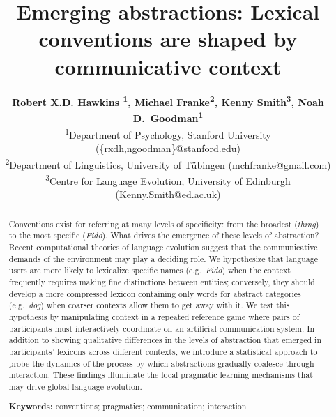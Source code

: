 \documentclass[10pt,letterpaper]{article}
\title{Emerging abstractions: Lexical conventions are shaped by communicative context}
\author{{\large \bf Robert X.D. Hawkins \textsuperscript{1}, Michael Franke\textsuperscript{2}, Kenny Smith\textsuperscript{3}, Noah D.~Goodman\textsuperscript{1}} \\
   \textsuperscript{1}Department of Psychology, Stanford University (\{rxdh,ngoodman\}@stanford.edu) \\
  \textsuperscript{2}Department of Linguistics, University of T\"ubingen (mchfranke@gmail.com)\\
  \textsuperscript{3}Centre for Language Evolution, University of Edinburgh (Kenny.Smith@ed.ac.uk)}
\newcommand{\mf}[1]{\textcolor{Red}{[ndg: #1]}}
\begin{document}
\maketitle



\begin{abstract}
Conventions exist for referring at many levels of specificity: from the broadest (\emph{thing}) to the most specific (\emph{Fido}). What drives the emergence of these levels of abstraction? Recent computational theories of language evolution suggest that the communicative demands of the environment may play a deciding role. We hypothesize that language users are more likely to lexicalize specific names (e.g.\ \emph{Fido}) when the context frequently requires making fine distinctions between entities; conversely, they should develop a more compressed lexicon containing only words for abstract categories (e.g.\ \emph{dog}) when coarser contexts allow them to get away with it. We test this hypothesis by manipulating context in a repeated reference game where pairs of participants must interactively coordinate on an artificial communication system. In addition to showing qualitative differences in the levels of abstraction that emerged in participants' lexicons across different contexts, we introduce a statistical approach to probe the dynamics of the process by which abstractions gradually coalesce through interaction. These findings illuminate the local pragmatic learning mechanisms that may drive global language evolution.

\textbf{Keywords:}
conventions; pragmatics; communication; interaction

\end{abstract}
\end{document}
